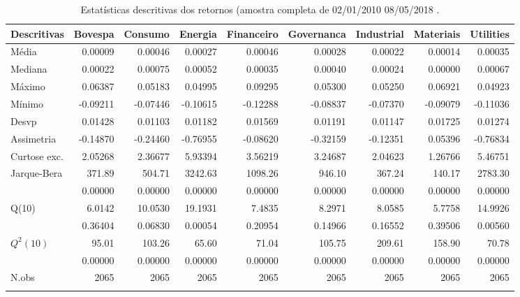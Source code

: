 \begin{longtable}{lrrrrrrrr}
\caption{Estatísticas descritivas dos retornos (amostra completa de 02/01/2010 08/05/2018 .} \\ 
  \toprule
Descritivas & Bovespa & Consumo & Energia & Financeiro & Governanca & Industrial & Materiais & Utilities \\ 
  \midrule
Média & 0.00009 & 0.00046 & 0.00027 & 0.00046 & 0.00028 & 0.00022 & 0.00014 & 0.00035 \\ 
  Mediana & 0.00022 & 0.00075 & 0.00052 & 0.00035 & 0.00040 & 0.00024 & 0.00000 & 0.00067 \\ 
  Máximo & 0.06387 & 0.05183 & 0.04995 & 0.09295 & 0.05300 & 0.05250 & 0.06921 & 0.04923 \\ 
  Mínimo & -0.09211 & -0.07446 & -0.10615 & -0.12288 & -0.08837 & -0.07370 & -0.09079 & -0.11036 \\ 
  Desvp & 0.01428 & 0.01103 & 0.01182 & 0.01569 & 0.01191 & 0.01147 & 0.01725 & 0.01274 \\ 
  Assimetria & -0.14870 & -0.24460 & -0.76955 & -0.08620 & -0.32159 & -0.12351 & 0.05396 & -0.76834 \\ 
  Curtose exc. & 2.05268 & 2.36677 & 5.93394 & 3.56219 & 3.24687 & 2.04623 & 1.26766 & 5.46751 \\ 
  Jarque-Bera & 371.89 & 504.71 & 3242.63 & 1098.26 & 946.10 & 367.24 & 140.17 & 2783.30 \\ 
   & 0.00000 & 0.00000 & 0.00000 & 0.00000 & 0.00000 & 0.00000 & 0.00000 & 0.00000 \\ 
  Q(10) & 6.0142 & 10.0530 & 19.1931 & 7.4835 & 8.2971 & 8.0585 & 5.7758 & 14.9926 \\ 
   & 0.36404 & 0.06830 & 0.00054 & 0.20954 & 0.14966 & 0.16552 & 0.39506 & 0.00560 \\ 
  $Q^2(10)$ & 95.01 & 103.26 & 65.60 & 71.04 & 105.75 & 209.61 & 158.90 & 70.78 \\ 
   & 0.00000 & 0.00000 & 0.00000 & 0.00000 & 0.00000 & 0.00000 & 0.00000 & 0.00000 \\ 
  N.obs & 2065 & 2065 & 2065 & 2065 & 2065 & 2065 & 2065 & 2065 \\ 
   \bottomrule
\label{tab:descritivas}
\end{longtable}
